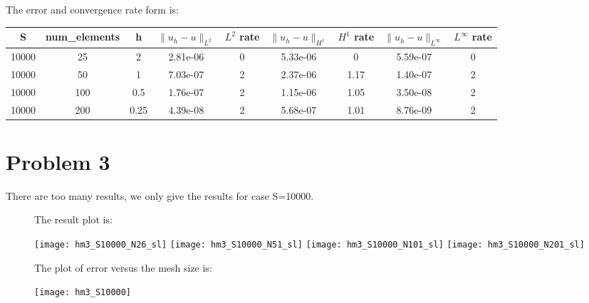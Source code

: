 \documentclass[11pt]{article}
\begin{document}
\begin{table}
	The error and convergence rate form is:\\
	\begin{center}
		\begin{tabular}{|c|c|c|c|c|c|c|c|c|} 
			\hline
			S & num\_elements  & h & $\|u_h-u\|_{L^{2}}$ & $L^{2}$ rate & $\|u_h-u\|_{H^{1}}$ & $H^{1}$ rate & $\|u_h-u\|_{L^{\infty}}$ & $L^{\infty}$ rate  \\ \hline
			10000 &  25   &   2  &  2.81e-06   &  0     &   5.33e-06 & 0 & 5.59e-07 & 0 \\
			10000 &  50   &   1 &  7.03e-07   &  2     &   2.37e-06 & 1.17 & 1.40e-07 & 2 \\
			10000 &  100   &   0.5  &  1.76e-07   &  2     &  1.15e-06 & 1.05 & 3.50e-08 & 2 \\
			10000 & 200   &   0.25  &  4.39e-08   &  2     &   5.68e-07 & 1.01 & 8.76e-09 & 2 \\
			\hline
		\end{tabular}
	\end{center}
\end{table}




\section{Problem 3}
There are too many results, we only give the results for case S=10000.\\ 
\begin{figure}
	The result plot is:\\
	\begin{center}
		\centering
		\texttt{[image: hm3\_S10000\_N26\_sl]}
		\texttt{[image: hm3\_S10000\_N51\_sl]}
		\texttt{[image: hm3\_S10000\_N101\_sl]}
		\texttt{[image: hm3\_S10000\_N201\_sl]}		
	\end{center}
	The plot of error versus the mesh size is:\\
	\begin{center}
		\centering
		\texttt{[image: hm3\_S10000]}	
	\end{center}
\end{figure}
\end{document}
